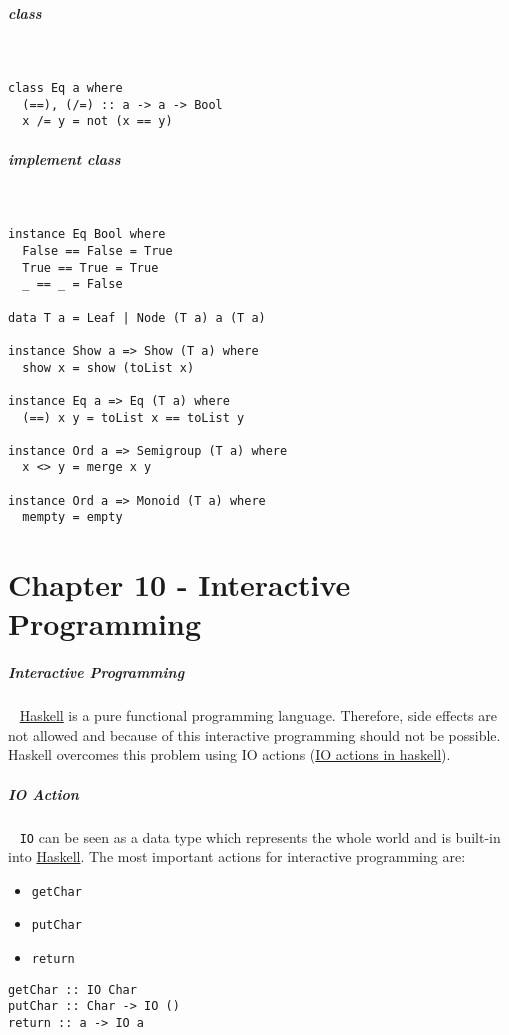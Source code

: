 \documentclass[11pt,twoside,landscape]{article}
\begin{document}
\begin{multicols}{3}
\subparagraph{class} \
\label{sec:orgb7e9cc6}
\lstset{language=haskell,label= ,caption= ,captionpos=b,numbers=none}
\begin{lstlisting}
class Eq a where
  (==), (/=) :: a -> a -> Bool
  x /= y = not (x == y)
\end{lstlisting}



\subparagraph{implement class} \
\label{sec:org955a08d}
\lstset{language=haskell,label= ,caption= ,captionpos=b,numbers=none}
\begin{lstlisting}
instance Eq Bool where
  False == False = True
  True == True = True
  _ == _ = False

data T a = Leaf | Node (T a) a (T a)

instance Show a => Show (T a) where
  show x = show (toList x)

instance Eq a => Eq (T a) where
  (==) x y = toList x == toList y

instance Ord a => Semigroup (T a) where
  x <> y = merge x y

instance Ord a => Monoid (T a) where
  mempty = empty
\end{lstlisting}

\section{Chapter 10 - Interactive Programming}
\label{sec:org6229c8f}
\subparagraph{Interactive Programming} \
\label{sec:org8eaabfc}
\href{../../../roam/20210618182407-haskell.org}{Haskell} is a pure functional programming language.
Therefore, side effects are not allowed and because of this interactive programming should not be possible.
Haskell overcomes this problem using IO actions (\href{../../../roam/20220508103131-io_actions_in_haskell.org}{IO actions in haskell}).

\subparagraph{IO Action} \
\label{sec:orgc696f9d}
\texttt{IO} can be seen as a data type which represents the whole world and is built-in into \href{../../../roam/20210618182407-haskell.org}{Haskell}.
The most important actions for interactive programming are:
\begin{itemize}
\item \texttt{getChar}
\item \texttt{putChar}
\item \texttt{return}
\end{itemize}

\lstset{language=haskell,label= ,caption= ,captionpos=b,numbers=none}
\begin{lstlisting}
getChar :: IO Char
putChar :: Char -> IO ()
return :: a -> IO a
\end{lstlisting}


\end{multicols}
\end{document}
